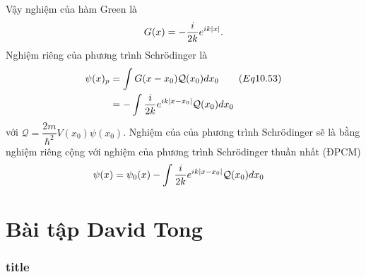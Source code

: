\documentclass{report}
\newcommand{\f}[2]{\dfrac{#1}{#2}}
\begin{document}
Vậy nghiệm của hàm Green là
\begin{align*}
	G(x) = -\f{i}{2k} e^{ik\abs{x}}.
\end{align*}
Nghiệm riêng của phương trình Schr\"{o}dinger là 
\begin{align*}
	\psi(x)_{p} 
	&= \int G(x - x_0) \mathcal{Q}(x_0) dx_0 \quad \quad (Eq 10.53) \\
	&= -\int \f{i}{2k} e^{ik\abs{x-x_0}} \mathcal{Q}(x_0) dx_0 
\end{align*}
với $\mathcal{Q}  = \f{2m}{\hbar^2}V(x_0) \psi(x_0)$.
Nghiệm của của phương trình Schr\"{o}dinger sẽ là bằng nghiệm riêng cộng với nghiệm của phương trình Schr\"{o}dinger thuần nhất (ĐPCM) 
\begin{align*}
	\psi(x) 
	&= \psi_0(x) - \int \f{i}{2k} e^{ik\abs{x-x_0}} \mathcal{Q}(x_0) dx_0 
\end{align*}


\section{Bài tập David Tong}
\subsubsection{title}
\end{document}
